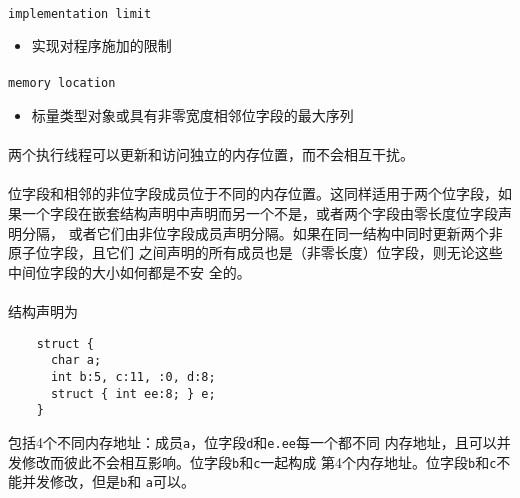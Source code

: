 \paragraph{}
\texttt{implementation limit}
\begin{itemize}
  \item[]{实现对程序施加的限制}
\end{itemize}

\paragraph{}
\texttt{memory location}
\begin{itemize}
  \item[]{标量类型对象或具有非零宽度相邻位字段的最大序列}
\end{itemize}

\paragraph{}
\notes 两个执行线程可以更新和访问独立的内存位置，而不会相互干扰。

\paragraph{}
\notes 位字段和相邻的非位字段成员位于不同的内存位置。这同样适用于两个位字段，如
果一个字段在嵌套结构声明中声明而另一个不是，或者两个字段由零长度位字段声明分隔，
或者它们由非位字段成员声明分隔。如果在同一结构中同时更新两个非原子位字段，且它们
之间声明的所有成员也是（非零长度）位字段，则无论这些中间位字段的大小如何都是不安
全的。

\paragraph{}
\ex* 结构声明为
\begin{lstlisting} 
    struct {
      char a;
      int b:5, c:11, :0, d:8;
      struct { int ee:8; } e;
    }
\end{lstlisting}
包括4个不同内存地址：成员\texttt{a}，位字段\texttt{d}和\texttt{e.ee}每一个都不同
内存地址，且可以并发修改而彼此不会相互影响。位字段\texttt{b}和\texttt{c}一起构成
第4个内存地址。位字段\texttt{b}和\texttt{c}不能并发修改，但是\texttt{b}和
\texttt{a}可以。

